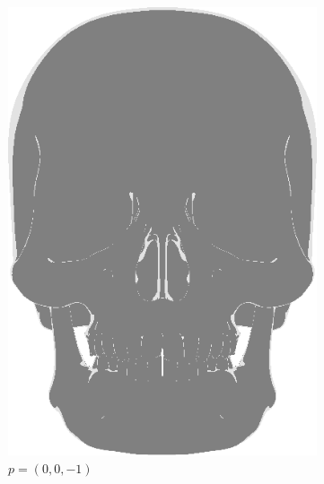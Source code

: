 \begin{figure}[h]
\centering
\begin{subfigure}[b]{0.22\textwidth}
        \includegraphics[width=\textwidth]{img/Lighting/Directional(0,-1).png}
        \caption{$p=(0,0,-1)$}
        \label{fig:LightingPosDir1}
\end{subfigure}
~
\hspace{24pt}
~
    \begin{subfigure}[b]{0.22\textwidth}

\end{subfigure}
\end{figure}
